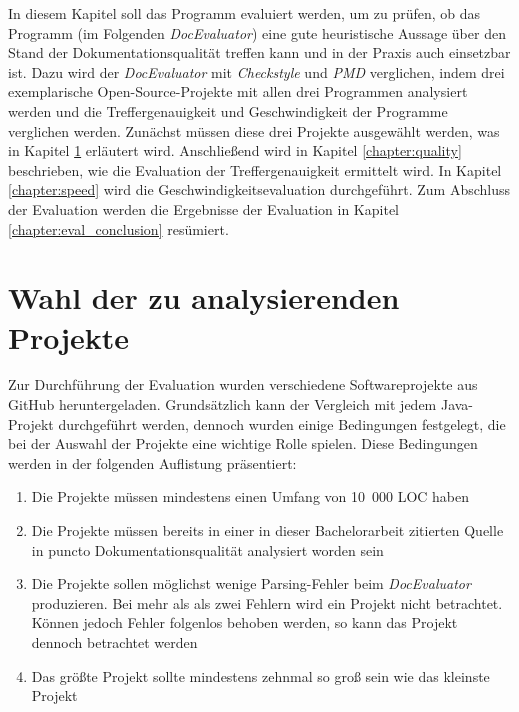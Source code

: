 \newcommand{\checkpmd}{\textit{Checkstyle} und \textit{PMD} }
\newcommand{\doceval}{\textit{DocEvaluator} }
In diesem Kapitel soll das Programm evaluiert werden, um zu prüfen, ob das Programm (im Folgenden \textit{DocEvaluator}) eine gute heuristische Aussage über den Stand der Dokumentationsqualität treffen kann und in der Praxis auch einsetzbar ist. Dazu wird der \textit{DocEvaluator} mit \textit{Checkstyle} und \textit{PMD} verglichen, indem drei exemplarische Open-Source-Projekte mit allen drei Programmen analysiert werden und die Treffergenauigkeit und Geschwindigkeit der Programme verglichen werden. Zunächst müssen diese drei Projekte ausgewählt werden, was in Kapitel \ref{chapter:choosing_project} erläutert wird. Anschließend wird in Kapitel \ref{chapter:quality} beschrieben, wie die Evaluation der Treffergenauigkeit ermittelt wird. In Kapitel \ref{chapter:speed} wird die Geschwindigkeitsevaluation durchgeführt. Zum Abschluss der Evaluation werden die Ergebnisse der Evaluation in Kapitel \ref{chapter:eval_conclusion} resümiert. 

\section{Wahl der zu analysierenden Projekte}\label{chapter:choosing_project}
Zur Durchführung der Evaluation wurden verschiedene Softwareprojekte aus GitHub heruntergeladen. Grundsätzlich kann der Vergleich mit jedem Java-Projekt durchgeführt werden, dennoch wurden einige Bedingungen festgelegt, die bei der Auswahl der Projekte eine wichtige Rolle spielen. Diese Bedingungen werden in der folgenden Auflistung präsentiert:

\begin{enumerate}
    \item \label{enum:size} Die Projekte müssen mindestens einen Umfang von 10~000 \ac{LOC} haben
    \item \label{enum:already_cited} Die Projekte müssen bereits in einer in dieser Bachelorarbeit zitierten Quelle in puncto Dokumentationsqualität analysiert worden sein
    \item \label{enum:parsing_error}  Die Projekte sollen möglichst wenige Parsing-Fehler beim \doceval produzieren. Bei mehr als als zwei Fehlern wird ein Projekt nicht betrachtet. Können jedoch Fehler folgenlos behoben werden, so kann das Projekt dennoch betrachtet werden
    \item Das größte Projekt sollte mindestens zehnmal so groß sein wie das kleinste Projekt
\end{enumerate}

